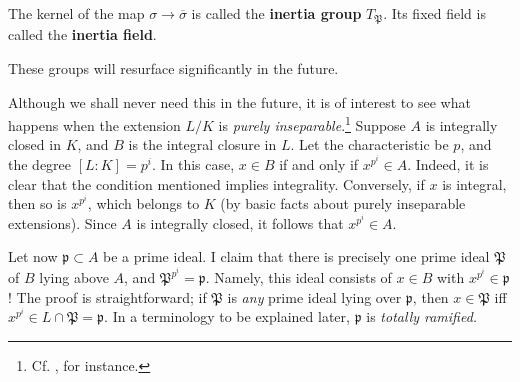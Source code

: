 \begin{definition} 
The kernel of the map $\sigma \to \overline{\sigma}$ is called the \textbf{inertia
group} $T_{\mathfrak{P}}$.  Its fixed field is called the \textbf{inertia
field}.
\end{definition}

These groups will resurface significantly in the future.

\begin{remark} Although we shall never need this in the future, it is of
interest to see what happens when the extension $L/K$ is \emph{purely
inseparable}.\footnote{Cf. \cite{La02}, for instance.}  Suppose $A$ is integrally closed in $K$, and $B$ is the integral closure in $L$.  Let the characteristic be $p$, and the degree $[L:K] = p^i$.
In this case, $x \in B$  if and only if $x^{p^i} \in A$. Indeed, it is clear that the condition mentioned implies integrality.  Conversely, if $x$ is integral, then so is $x^{p^i}$, which belongs to $K$ (by basic facts about purely inseparable extensions).  Since $A$ is integrally closed, it follows that $x^{p^i} \in A$.

Let now $\mathfrak{p} \subset A$ be a prime ideal.  I claim that there is precisely one prime ideal $\mathfrak{P}$ of $B$ lying above $A$, and $\mathfrak{P}^{p^i} = \mathfrak{p}$.  Namely, this ideal consists of $x \in B$ with $x^{p^i} \in \mathfrak{p}$!  The proof is straightforward; if $\mathfrak{P}$ is \emph{any} prime ideal lying over $\mathfrak{p}$, then $x \in \mathfrak{P}$ iff $x^{p^i} \in L \cap \mathfrak{P} = \mathfrak{p}$.   In a terminology to be explained later, $\mathfrak{p}$ is \emph{totally ramified.}
\end{remark}



